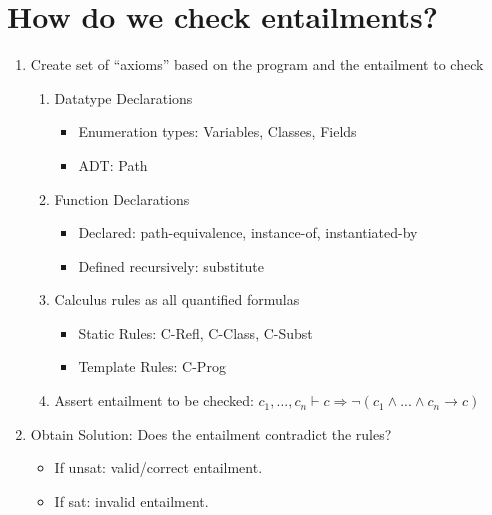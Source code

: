 \documentclass[a4paper]{article}
\begin{document}

\section{How do we check entailments?}
\begin{enumerate}
  \item Create set of ``axioms'' based on the program and the entailment to check
  \begin{enumerate}
    \item Datatype Declarations
    \begin{itemize}
      \item Enumeration types: Variables, Classes, Fields
      \item ADT: Path
    \end{itemize}
    \item Function Declarations
    \begin{itemize}
      \item Declared: path-equivalence, instance-of, instantiated-by
      \item Defined recursively: substitute
    \end{itemize}
    \item Calculus rules as all quantified formulas
    \begin{itemize}
      \item Static Rules: C-Refl, C-Class, C-Subst
      \item Template Rules: C-Prog
    \end{itemize}
    \item Assert entailment to be checked: $c_1,...,c_n \vdash c \Rightarrow \neg (c_1 \land ... \land c_n → c)$
  \end{enumerate}
  \item Obtain Solution: Does the entailment contradict the rules?
  \begin{itemize}
    \item If unsat: valid/correct entailment.
    \item If sat: invalid entailment.
  \end{itemize}
\end{enumerate}
\end{document}
